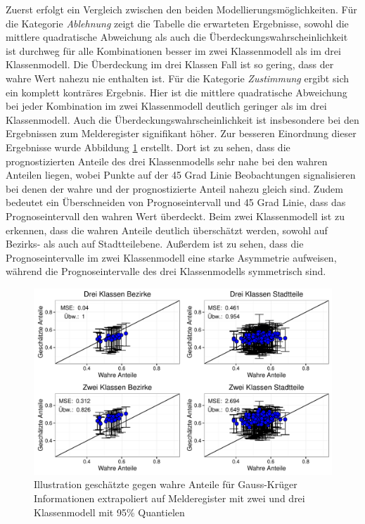 \documentclass{Vorlage}
\begin{document}
Zuerst erfolgt ein Vergleich zwischen den beiden Modellierungsmöglichkeiten. Für die Kategorie \textit{Ablehnung} zeigt die Tabelle die erwarteten Ergebnisse, sowohl die mittlere quadratische Abweichung als auch die Überdeckungswahrscheinlichkeit ist durchweg für alle Kombinationen besser im zwei Klassenmodell als im drei Klassenmodell. Die Überdeckung im drei Klassen Fall ist so gering, dass der wahre Wert nahezu nie enthalten ist. Für die Kategorie \textit{Zustimmung} ergibt sich ein komplett konträres Ergebnis. Hier ist die mittlere quadratische Abweichung bei jeder Kombination im zwei Klassenmodell deutlich geringer als im drei Klassenmodell. Auch die Überdeckungswahrscheinlichkeit ist insbesondere bei den Ergebnissen zum Melderegister signifikant höher. Zur besseren Einordnung dieser Ergebnisse wurde Abbildung \ref{vali4} erstellt. Dort ist zu sehen, dass die prognostizierten Anteile des drei Klassenmodells sehr nahe bei den wahren Anteilen liegen, wobei Punkte auf der 45 Grad Linie Beobachtungen signalisieren bei denen der wahre und der prognostizierte Anteil nahezu gleich sind. Zudem bedeutet ein Überschneiden von Prognoseintervall und 45 Grad Linie, dass das Prognoseintervall den wahren Wert überdeckt. Beim zwei Klassenmodell ist zu erkennen, dass die wahren Anteile deutlich überschätzt werden, sowohl auf Bezirks- als auch auf Stadtteilebene. Außerdem ist zu sehen, dass die Prognoseintervalle im zwei Klassenmodell eine starke Asymmetrie aufweisen, während die Prognoseintervalle des drei Klassenmodells symmetrisch sind.

\begin{figure}[h]
 \begin{center}
 \includegraphics[scale=0.8]{Pictures/PaT2}
 \caption{Illustration geschätzte gegen wahre Anteile für Gauss-Krüger Informationen extrapoliert auf  Melderegister mit zwei und drei Klassenmodell mit 95\% Quantielen}
 \label{vali4}
 \end{center}
\end{figure}
\end{document}
